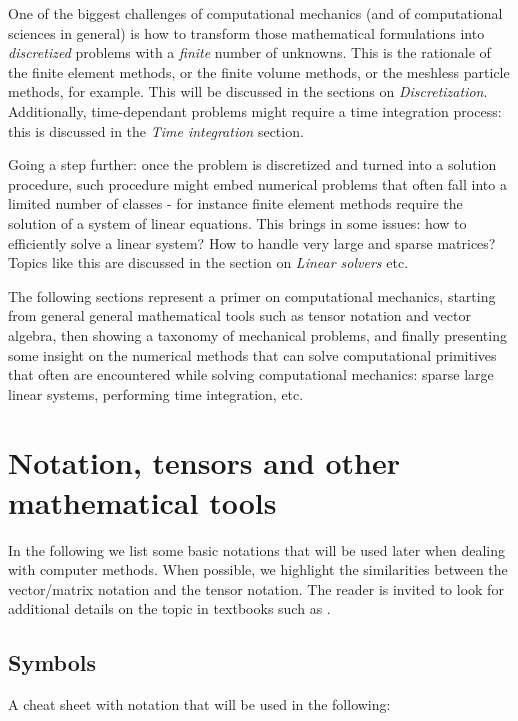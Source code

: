 \documentclass{digitaldynamics}
\begin{document}
One of the biggest challenges of computational mechanics (and of computational sciences in general) is how to transform those mathematical formulations into \textit{discretized} problems with a \textit{finite} number of unknowns. This is the rationale of the finite element methods, or the finite volume methods, or the meshless particle methods, for example. This will be discussed in the sections on \textit{Discretization}. Additionally, time-dependant problems might require a time integration process: this is discussed in the \textit{Time integration} section.

Going a step further: once the problem is discretized and turned into a solution procedure, such procedure might embed numerical problems that often fall into a limited number of classes - for instance finite element methods require the solution of a system of linear equations. This brings in some issues: how to efficiently solve a linear system? How to handle very large and sparse matrices? Topics like this are discussed in the section on \textit{Linear solvers} etc.

The following sections represent a primer on computational mechanics, starting from general general mathematical tools such as tensor notation and vector algebra, then showing a taxonomy of mechanical problems, and finally presenting some insight on the numerical methods that can solve computational primitives that often are encountered while solving computational mechanics: sparse large linear systems, performing time integration, etc.


\newpage
\section{Notation, tensors and other mathematical tools}

In the following we list some basic notations that will be used later when dealing with computer methods. 
When possible, we highlight the similarities between the vector/matrix notation and the tensor notation.
The reader is invited to look for additional details on the topic in textbooks such as \cite{Hackbusch2012,Truesdell2004}.


\subsection{Symbols}

A cheat sheet with notation that will be used in the following:
\end{document}

